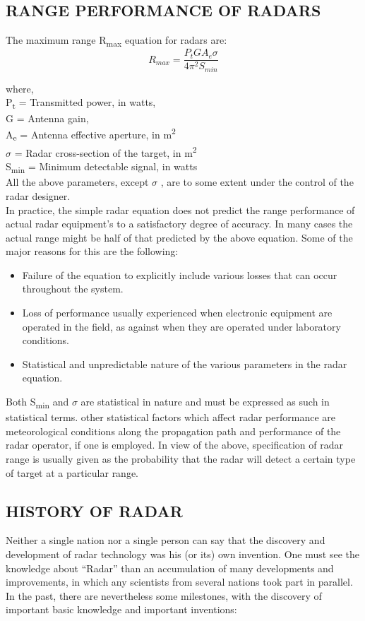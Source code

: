 \documentclass[14pt]{article} %
\begin{document}
\subsection{RANGE PERFORMANCE OF RADARS}
The maximum range R\textsubscript{max} equation for radars are:
\[R_{max} = \dfrac{P_tGA_e\sigma}{4\pi^{2}S_{min}} \]

where, \\ \indent P\textsubscript{t} = Transmitted power, in watts,
              \\ \indent G = Antenna gain,
              \\ \indent A\textsubscript{e} = Antenna effective aperture, in m\textsuperscript{2}
                         \\ \indent $\sigma$ =  Radar cross-section of the target, in m\textsuperscript{2}
              \\ \indent S\textsubscript{min} =  Minimum detectable signal, in watts\\


All the above parameters, except $\sigma$  , are to some extent under the control of the radar designer.
\\ In practice, the simple radar equation does not predict the range performance of actual radar equipment’s to a satisfactory degree of accuracy.
 In many cases the actual range might be half of that predicted by the above equation. Some of the major reasons for this are the following:
\begin{itemize} 
\item  Failure of the equation to explicitly include various losses that can occur throughout the system.
\item Loss of performance usually experienced when electronic equipment are operated in the field, as against when they are operated under laboratory conditions.
\item Statistical and unpredictable nature of the various parameters in the radar equation.
\end{itemize}
Both S\textsubscript{min} and $\sigma$ are statistical in nature and must be expressed as such in statistical terms. other statistical factors which affect radar performance are meteorological conditions along the propagation path and performance of the radar operator, if one is employed.
In view of the above, specification of radar range is usually given as the probability that the radar will detect a certain type of target at a particular range.

\subsection{HISTORY OF RADAR}
 Neither a single nation nor a single person can say that the discovery and development of radar technology was his (or its) own invention. One must see the knowledge about “Radar” than an accumulation of many developments and improvements, in which any scientists from several nations took part in parallel. In the past, there are nevertheless some milestones, with the discovery of important basic knowledge and important inventions:
 
\end{document}
